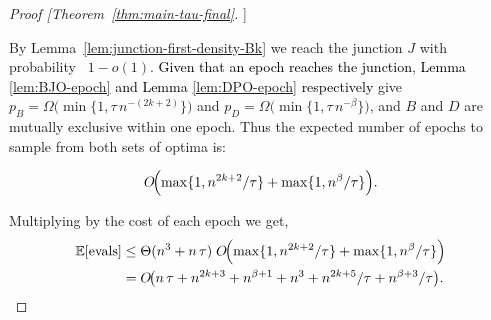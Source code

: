 \documentclass[lettersize,journal]{IEEEtran}
\newcommand{\rerev}[1]{\textcolor{black}{#1}}
\newcommand{\EE}{\mathbb{E}}
\begin{document}
\begin{proof}[Proof [Theorem~\ref{thm:main-tau-final}]]
	
	By Lemma~\ref{lem:junction-first-density-Bk} we reach the junction $J$ with probability \ \(1-o(1)\).
	\rerev{Given that an epoch reaches the junction}, %
	\rerev{Lemma \ref{lem:BJO-epoch}  and Lemma \ref{lem:DPO-epoch} respectively} give
	$p_B=\Omega\!\bigl(\min\{1,\tau\,n^{-(2k+2)}\}\bigr)$ and
	$p_D=\Omega\!\bigl(\min\{1,\tau\,n^{-\beta}\}\bigr)$,
	and \(B\) and \(D\) are mutually exclusive within one epoch. Thus the expected number of epochs to sample from both sets of optima is:
	
	\[
	O\!\Bigl(
	\max\{1,n^{2k+2}/\tau\}
	+\max\{1,n^{\beta}/\tau\}
	\Bigr).
	\]
	
	Multiplying by the cost of each epoch we get,
	\begin{align*}
		\EE[\text{evals}]
		&\le
		\rerev{\Theta(n^3+n\,\tau)}\;
		O\!\Bigl(
		\max\{1,n^{2k+2}/\tau\}
		+\max\{1,n^{\beta}/\tau\}
		\Bigr)
		\\&=
		\rerev{O\!\bigl(
		n\,\tau
		+n^{2k+3}
		+n^{\beta+1}
		+n^3
		+n^{2k+5}/\tau
		+n^{\beta+3}/\tau
		\bigr)}.
	\end{align*}
\end{proof}
\end{document}
